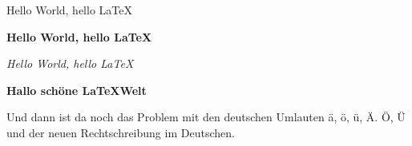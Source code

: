 \documentclass[12pt, a4paper]{scrartcl}
\begin{document}
Hello World, hello \LaTeX

\textbf{Hello World, hello \LaTeX}

\textit{Hello World, hello \LaTeX}

\textbf{Hallo schöne \LaTeX Welt}

Und dann ist da noch das Problem mit den deutschen Umlauten ä, ö, ü, Ä. Ö, Ü und der neuen Rechtschreibung im Deutschen.
\end{document}
